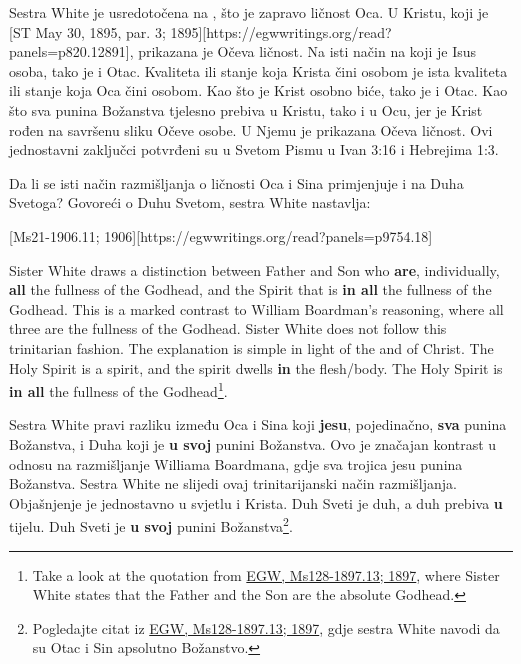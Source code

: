 Sestra White je usredotočena na , što je zapravo ličnost Oca. U Kristu, koji je [ST May 30, 1895, par. 3; 1895][https://egwwritings.org/read?panels=p820.12891], prikazana je Očeva ličnost. Na isti način na koji je Isus osoba, tako je i Otac. Kvaliteta ili stanje koja Krista čini osobom je ista kvaliteta ili stanje koja Oca čini osobom. Kao što je Krist osobno biće, tako je i Otac. Kao što sva punina Božanstva tjelesno prebiva u Kristu, tako i u Ocu, jer je Krist rođen na savršenu sliku Očeve osobe. U Njemu je prikazana Očeva ličnost. Ovi jednostavni zaključci potvrđeni su u Svetom Pismu u Ivan 3:16 i Hebrejima 1:3.

Da li se isti način razmišljanja o ličnosti Oca i Sina primjenjuje i na Duha Svetoga? Govoreći o Duhu Svetom, sestra White nastavlja:

[Ms21-1906.11; 1906][https://egwwritings.org/read?panels=p9754.18]


Sister White draws a distinction between Father and Son who \textbf{are}, individually, \textbf{all} the fullness of the Godhead, and the Spirit that is \textbf{in all }the fullness of the Godhead. This is a marked contrast to William Boardman’s reasoning, where all three are the fullness of the Godhead. Sister White does not follow this trinitarian fashion. The explanation is simple in light of the  and of Christ. The Holy Spirit is a spirit, and the spirit dwells \textbf{in} the flesh/body. The Holy Spirit is \textbf{in all} the fullness of the Godhead\footnote{Take a look at the quotation from \href{https://egwwritings.org/?ref=en_Ms128-1897.13&para=5426.19}{{EGW, Ms128-1897.13; 1897}}, where Sister White states that the Father and the Son are the absolute Godhead.}.


Sestra White pravi razliku između Oca i Sina koji \textbf{jesu}, pojedinačno, \textbf{sva} punina Božanstva, i Duha koji je \textbf{u svoj} punini Božanstva. Ovo je značajan kontrast u odnosu na razmišljanje Williama Boardmana, gdje sva trojica jesu punina Božanstva. Sestra White ne slijedi ovaj trinitarijanski način razmišljanja. Objašnjenje je jednostavno u svjetlu  i Krista. Duh Sveti je duh, a duh prebiva \textbf{u} tijelu. Duh Sveti je \textbf{u svoj} punini Božanstva\footnote{Pogledajte citat iz \href{https://egwwritings.org/?ref=en_Ms128-1897.13&para=5426.19}{{EGW, Ms128-1897.13; 1897}}, gdje sestra White navodi da su Otac i Sin apsolutno Božanstvo.}.

